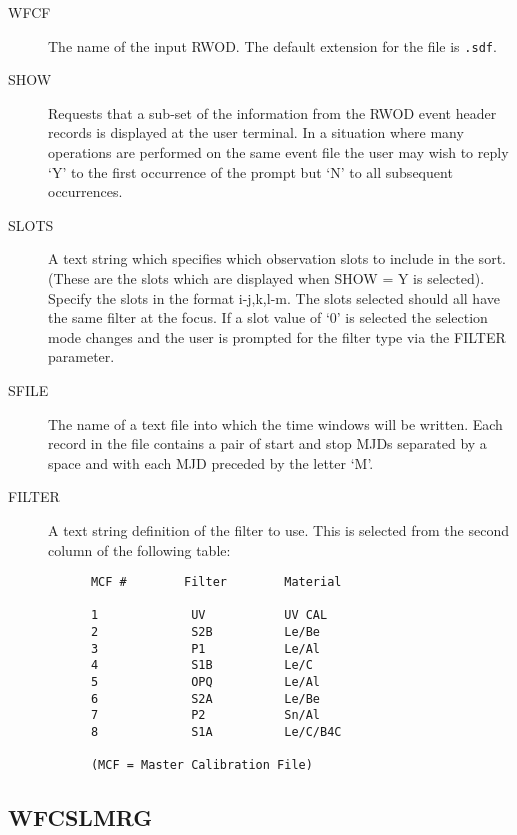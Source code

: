 \begin{description}

\item[WFCF]
The name of the input RWOD.  The default extension for the file is {\tt .sdf}.

\item[SHOW]
Requests that a sub-set of the information from the RWOD event header records 
is displayed at the user terminal. In a situation where many
operations are performed on the same event file the user may wish to 
reply `Y' to the first occurrence of the prompt but `N' to all subsequent
occurrences.

\item[SLOTS]
A text string which specifies which observation slots to include in
the sort. (These are the slots which are displayed when SHOW = Y is selected).
Specify the slots in the format i-j,k,l-m. The slots selected
should all have the same filter at the focus. If a slot value of `0' is
selected the selection mode changes and the user is prompted for the 
filter type via the FILTER parameter.

\item[SFILE]
The name of a text file into which the time windows will be written.
Each record in the file contains a pair of start and stop MJDs
separated by a space and with each MJD preceded by the letter `M'.

\item[FILTER]
A text string definition of the filter to use. This is selected from
the second column of the following table:

\begin{verbatim}
      MCF #        Filter        Material

      1             UV           UV CAL
      2             S2B          Le/Be
      3             P1           Le/Al
      4             S1B          Le/C
      5             OPQ          Le/Al
      6             S2A          Le/Be
      7             P2           Sn/Al
      8             S1A          Le/C/B4C
 
      (MCF = Master Calibration File)
\end{verbatim}

\end{description}

\subsection{WFCSLMRG}
\label{sec:programs:wfcslmrg}

